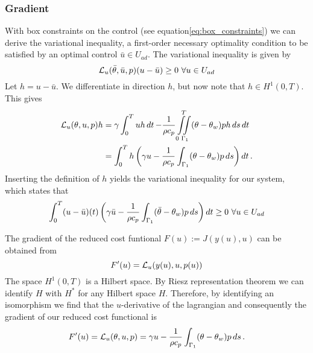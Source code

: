 \subsubsection{Gradient}
With box constraints on the control (see equation\eqref{eq:box_constraints}) we can derive the variational inequality, a first-order necessary optimality condition to be satisfied by an optimal control $\bar{u} \in U_{ad}$. The variational inequality is given by 
\begin{equation*}
    \mathcal{L}_u(\bar{\theta},\bar{u},p)(u-\bar{u}) \geq 0\ \forall u\in U_{ad}
\end{equation*}
Let $h = u - \bar{u}$. We differentiate in direction $h$, but now note that $h\in H^1(0, T)$. This gives
\begin{equation}
\begin{aligned} %
  \L_u(\theta, u, p) h &= \gamma\int_0^T uh \dt - \frac{1}{\rho c_p} \iint\limits_{0\,\,\Gamma_1}^{\,\,\,T}(\theta - \theta_w)ph \dsdt \\
  &= \int_0^T h \left( \gamma u - \frac{1}{\rho c_p} \int_{\Gamma_1}(\theta - \theta_w)p \mathop{ds} \right) \dt.
\end{aligned}
\end{equation}
Inserting the definition of $h$ yields the variational inequality for our system, which states that
\begin{equation}
    \label{eq:variational}
    \int_0^T (u - \bar{u})(t) \left( \gamma \bar{u} - \frac{1}{\rho c_p} \int_{\Gamma_1}(\bar{\theta} - \theta_w)p \mathop{ds} \right) \mathop{dt} \geq 0\ \forall u \in U_{ad}
\end{equation}

The gradient of the reduced cost funtional $F(u) := J(y(u),u)$ can be obtained from 
\begin{equation*}
    F'(u) = \mathcal{L}_u(y(u),u,p(u))
\end{equation*}
%
The space $H^1(0,T)$ is a Hilbert space. By Riesz representation theorem we can identify $H$ with $H^{*}$ for any Hilbert space $H$. Therefore, by identifying an isomorphism %
we find that the $u$-derivative of the lagrangian and consequently the gradient of our reduced cost functional is
%
\begin{equation*}
    F'(u) = \mathcal{L}_u(\theta,u,p) = \gamma u - \frac{1}{\rho c_p}\int_{\Gamma_1}(\theta - \theta_w)p \mathop{ds}.
\end{equation*}


